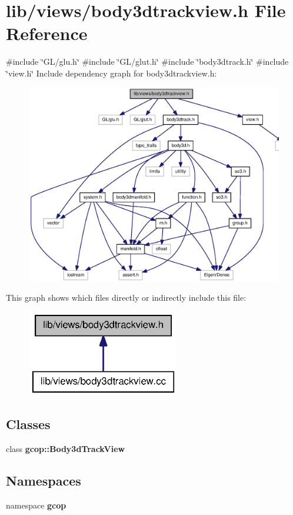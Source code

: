 \section{lib/views/body3dtrackview.h \-File \-Reference}
\label{body3dtrackview_8h}
{\ttfamily \#include \char`\"{}\-G\-L/glu.\-h\char`\"{}}\*
{\ttfamily \#include \char`\"{}\-G\-L/glut.\-h\char`\"{}}\*
{\ttfamily \#include \char`\"{}body3dtrack.\-h\char`\"{}}\*
{\ttfamily \#include \char`\"{}view.\-h\char`\"{}}\*
\-Include dependency graph for body3dtrackview.\-h\-:\nopagebreak
\begin{figure}[H]
\begin{center}
\leavevmode
\includegraphics[width=350pt]{body3dtrackview_8h__incl}
\end{center}
\end{figure}
\-This graph shows which files directly or indirectly include this file\-:\nopagebreak
\begin{figure}[H]
\begin{center}
\leavevmode
\includegraphics[width=188pt]{body3dtrackview_8h__dep__incl}
\end{center}
\end{figure}
\subsection*{\-Classes}
\begin{DoxyCompactItemize}
\item 
class {\bf gcop\-::\-Body3d\-Track\-View}
\end{DoxyCompactItemize}
\subsection*{\-Namespaces}
\begin{DoxyCompactItemize}
\item 
namespace {\bf gcop}
\end{DoxyCompactItemize}
